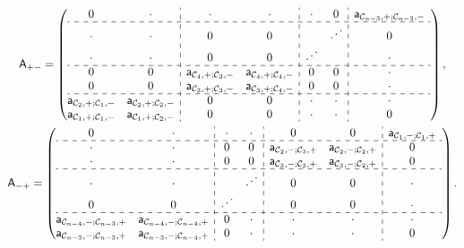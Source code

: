 \documentclass[pdftex]{sigma}
\numberwithin{equation}{section}
\begin{document}
\begin{gather}\label{Apmblock}
\mathsf A_{+-}=
\left( \begin{array}{@{}cc:cc:cc:cc@{}}
0 & \cdot & \cdot & \cdot & \cdot & 0 & \mathsf a_{\mathcal C_{n-3},+;\mathcal C_{n-3},-} \\
\hdashline
\cdot & \cdot & 0 & 0 & & \iddots & 0\\
\cdot & \cdot & 0 & 0 & \iddots & & \cdot
\\ \hdashline
0 & 0 & \mathsf a_{\mathcal C_4,+;\mathcal C_3,-} &
\mathsf a_{\mathcal C_4,+;\mathcal C_4,-} & 0 & 0 & \cdot \\
0 & 0 & \mathsf a_{\mathcal C_3,+;\mathcal C_3,-} &
\mathsf a_{\mathcal C_3,+;\mathcal C_4,-} & 0 & 0 & \cdot\\
\hdashline
\mathsf a_{\mathcal C_2,+;\mathcal C_1,-} &
\mathsf a_{\mathcal C_2,+;\mathcal C_2,-} & 0 & 0 & \cdot & \cdot & \cdot \\
\mathsf a_{\mathcal C_1,+;\mathcal C_1,-} &
\mathsf a_{\mathcal C_1,+;\mathcal C_2,-} & 0 & 0 & \cdot & \cdot & 0
\end{array} \right), \\
\mathsf A_{-+}=
\left( \begin{array}{@{}cc:cc:cc:cc@{}}
0 & \cdot & \cdot & \cdot & 0 & 0 & \mathsf a_{\mathcal C_{1},-;\mathcal C_{1},+} \\
\hdashline
\cdot & \cdot & 0 & 0 & \mathsf a_{\mathcal C_{2},-;\mathcal C_{3},+} & \mathsf a_{\mathcal C_{2},-;\mathcal C_{2},+} & 0\\
\cdot & \cdot & 0 & 0 & \mathsf a_{\mathcal C_{3},-;\mathcal C_{3},+} & \mathsf a_{\mathcal C_{3},-;\mathcal C_{2},+} & 0
\\ \hdashline
\cdot & \cdot & &
\iddots & 0 & 0 & \cdot \\
0 & 0 & \iddots &
& 0 & 0 & \cdot\\
\hdashline
\mathsf a_{\mathcal C_{n-4},-;\mathcal C_{n-3},+} &
\mathsf a_{\mathcal C_{n-4},-;\mathcal C_{n-4},+} & 0 & \cdot & \cdot & \cdot & \cdot \\
\mathsf a_{\mathcal C_{n-3},-;\mathcal C_{n-3},+} &
\mathsf a_{\mathcal C_{n-3},-;\mathcal C_{n-4},+} & 0 & \cdot & \cdot & \cdot & 0
\end{array} \right).\nonumber
\end{gather}
\end{document}
